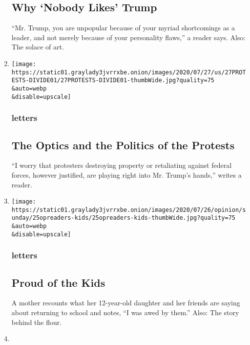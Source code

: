 \begin{enumerate}
{  \subsection{Why `Nobody Likes' Trump}\label{why-nobody-likes-trump}}

  ``Mr. Trump, you are unpopular because of your myriad shortcomings as
  a leader, and not merely because of your personality flaws,'' a reader
  says. Also: The solace of art.
\item
  \href{/2020/07/29/opinion/letters/protests-portland.html}{}

  \texttt{[image: https://static01.graylady3jvrrxbe.onion/images/2020/07/27/us/27PROTESTS-DIVIDE01/27PROTESTS-DIVIDE01-thumbWide.jpg?quality=75\\\&auto=webp\\\&disable=upscale]}

  \hypertarget{letters-5}{%
  \subsubsection{letters}\label{letters-5}}

  \hypertarget{the-optics-and-the-politics-of-the-protests}{%
  \subsection{The Optics and the Politics of the
  Protests}\label{the-optics-and-the-politics-of-the-protests}}

  ``I worry that protesters destroying property or retaliating against
  federal forces, however justified, are playing right into Mr. Trump's
  hands,'' writes a reader.
\item
  \href{/2020/07/29/opinion/letters/children-pandemic.html}{}

  \texttt{[image: https://static01.graylady3jvrrxbe.onion/images/2020/07/26/opinion/sunday/25opreaders-kids/25opreaders-kids-thumbWide.jpg?quality=75\\\&auto=webp\\\&disable=upscale]}

  \hypertarget{letters-6}{%
  \subsubsection{letters}\label{letters-6}}

  \hypertarget{proud-of-the-kids}{%
  \subsection{Proud of the Kids}\label{proud-of-the-kids}}

  A mother recounts what her 12-year-old daughter and her friends are
  saying about returning to school and notes, ``I was awed by them.''
  Also: The story behind the flour.
\item
  \href{/2020/07/28/opinion/letters/pandemic-families.html}{}


\end{enumerate}
